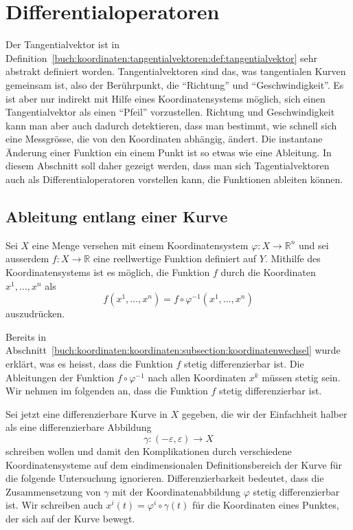 %
%
%
\section{Differentialoperatoren
\label{buch:koordinaten:section:differentialoperatoren}}
Der Tangentialvektor ist in
Definition~\ref{buch:koordinaten:tangentialvektoren:def:tangentialvektor}
sehr abstrakt definiert worden.
Tangentialvektoren sind das, was tangentialen Kurven gemeinsam ist,
also der Berührpunkt, die ``Richtung'' und ``Geschwindigkeit''.
Es ist aber nur indirekt mit Hilfe eines Koordinatensystems möglich, sich 
einen Tangentialvektor als einen ``Pfeil'' vorzustellen.
Richtung und Geschwindigkeit kann man aber auch dadurch detektieren, dass
man bestimmt, wie schnell sich eine Messgrösse, die von den Koordinaten
abhängig, ändert.
Die instantane Änderung einer Funktion ein einem Punkt ist so etwas
wie eine Ableitung.
In diesem Abschnitt soll daher gezeigt werden, dass man sich
Tagentialvektoren auch als Differentialoperatoren vorstellen
kann, die Funktionen ableiten können.

%
%
\subsection{Ableitung entlang einer Kurve}
Sei $X$ eine Menge versehen mit einem Koordinatensystem
$\varphi\colon X\to \mathbb{R}^n$ und sei ausserdem 
$f\colon X\to\mathbb{R}$ eine reellwertige Funktion definiert
auf $Y$.
Mithilfe des Koordinatensystems ist es möglich, die Funktion $f$
durch die Koordinaten $x^1,\dots,x^n$ als
\[
f(x^1,\dots,x^n) = f\circ\varphi^{-1} (x^1,\dots,x^n)
\]
auszudrücken.

Bereits in
Abschnitt~\ref{buch:koordinaten:koordinaten:subsection:koordinatenwechsel}
wurde erklärt, was es heisst, dass die Funktion $f$ stetig differenzierbar
ist.
Die Ableitungen der Funktion $f\circ\varphi^{-1}$ nach allen Koordinaten
$x^k$ müssen stetig sein.
Wir nehmen im folgenden an, dass die Funktion $f$ stetig differenzierbar
ist.

Sei jetzt eine differenzierbare Kurve in $X$ gegeben, die wir
der Einfachheit halber als eine differenzierbare Abbildung
\[
\gamma\colon (-\varepsilon,\varepsilon) \to X
\]
schreiben wollen und damit den Komplikationen durch verschiedene
Koordinatensysteme auf dem eindimensionalen Definitionsbereich der
Kurve für die folgende Untersuchung ignorieren.
Differenzierbarkeit bedeutet, dass die Zusammensetzung von $\gamma$
mit der Koordinatenabbildung $\varphi$ stetig differenzierbar ist.
Wir schreiben auch $x^i(t) = \varphi^i\circ\gamma(t)$ für die Koordinaten
eines Punktes, der sich auf der Kurve bewegt.


